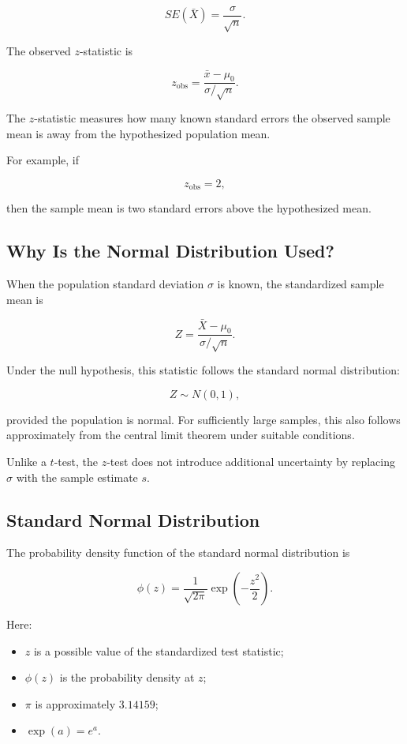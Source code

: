 \documentclass[11pt]{article}
\begin{document}
\[
SE(\bar{X})=\frac{\sigma}{\sqrt{n}}.
\]

The observed \(z\)-statistic is

\[
\boxed{
z_{\mathrm{obs}}
=
\frac{\bar{x}-\mu_0}{\sigma/\sqrt{n}}
}.
\]

The \(z\)-statistic measures how many known standard errors the observed
sample mean is away from the hypothesized population mean.

For example, if

\[
z_{\mathrm{obs}}=2,
\]

then the sample mean is two standard errors above the hypothesized mean.

\subsection{Why Is the Normal Distribution Used?}

When the population standard deviation \(\sigma\) is known, the
standardized sample mean is

\[
Z
=
\frac{\bar{X}-\mu_0}{\sigma/\sqrt{n}}.
\]

Under the null hypothesis, this statistic follows the standard normal
distribution:

\[
Z\sim N(0,1),
\]

provided the population is normal. For sufficiently large samples, this
also follows approximately from the central limit theorem under suitable
conditions.

Unlike a \(t\)-test, the \(z\)-test does not introduce additional
uncertainty by replacing \(\sigma\) with the sample estimate \(s\).

\subsection{Standard Normal Distribution}

The probability density function of the standard normal distribution is

\[
\phi(z)
=
\frac{1}{\sqrt{2\pi}}
\exp\left(-\frac{z^2}{2}\right).
\]

Here:

\begin{itemize}[noitemsep]
    \item \(z\) is a possible value of the standardized test statistic;
    \item \(\phi(z)\) is the probability density at \(z\);
    \item \(\pi\) is approximately \(3.14159\);
    \item \(\exp(a)=e^a\).
\end{itemize}
\end{document}
